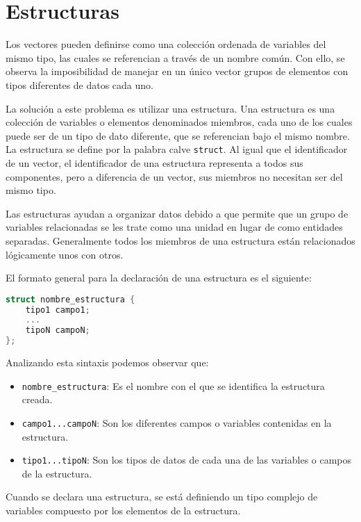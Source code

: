 \section{Estructuras}
Los vectores pueden definirse como una colección ordenada de variables del mismo tipo, las cuales se referencian a través de un nombre común. Con ello, se observa la imposibilidad de manejar en un único vector grupos de elementos con tipos diferentes de datos cada uno.

La solución a este problema es utilizar una estructura. Una estructura es una colección de variables o elementos denominados miembros, cada uno de los cuales puede ser de un tipo de dato diferente, que se referencian bajo el mismo nombre. La estructura se define por la palabra calve \texttt{struct}. Al igual que el identificador de un vector, el identificador de una estructura representa a todos sus componentes, pero a diferencia de un vector, sus miembros no necesitan ser del mismo tipo.

Las estructuras ayudan a organizar datos debido a que permite que un grupo de variables relacionadas se les trate como una unidad en lugar de como entidades separadas. Generalmente todos los miembros de una estructura están relacionados lógicamente unos con otros.

El formato general para la declaración de una estructura es el siguiente:
\begin{lstlisting}[language=C]
struct nombre_estructura {
    tipo1 campo1;
    ...
    tipoN campoN;
};
\end{lstlisting}
Analizando esta sintaxis podemos observar que:
\begin{itemize}
	\item \texttt{nombre\_estructura}: Es el nombre con el que se identifica la estructura creada.
	\item \texttt{campo1...campoN}: Son los diferentes campos o variables contenidas en la estructura.
	\item \texttt{tipo1...tipoN}: Son los tipos de datos de cada una de las variables o campos de la estructura.
\end{itemize}
Cuando se declara una estructura, se está definiendo un tipo complejo de variables compuesto por los elementos de la estructura.

